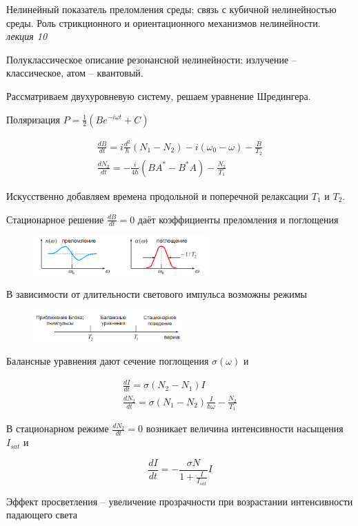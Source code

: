 
\begin{leftrules}
Нелинейный показатель преломления среды; связь с кубичной нелинейностью среды. Роль стрикционного и ориентационного механизмов нелинейности.
\\ \phantom{42} \hfill \textit{лекция 10} 
\end{leftrules}





Полуклассическое описание резонансной нелинейности:
излучение – классическое, атом – квантовый.

Рассматриваем двухуровневую систему, решаем уравнение Шредингера.

Поляризация $    P = \frac{1}{2} (B e^{-i \omega t } + C) $

\begin{align}
    \frac{d B}{d t} = i \frac{d^2}{\hbar}(N_1 - N_2) - i (\omega_0 - \omega) - \frac{B}{T_2} \\
    \frac{d N_2}{d t} = - \frac{i}{4 \hbar} (BA^* - B^*A) - \frac{N_2}{T_1}
\end{align}

Искусственно добавляем времена продольной и поперечной релаксации $T_1$ и $T_2$.

Стационарное решение $\frac{d B}{d t} = 0$ даёт коэффициенты преломления и поглощения

\begin{figure}[h]
    \centering
    \includegraphics[width=0.6\textwidth]{figures/16-1.png}
\end{figure}


В зависимости от длительности светового импульса возможны режимы

\begin{figure}[h]
    \centering
    \includegraphics[width=0.5\textwidth]{figures/16-2.png}
\end{figure}

Балансные уравнения дают сечение поглощения $\sigma(\omega)$ и

\begin{align}
    \frac{d I}{d t} = \sigma (N_2 - N_1) I \\
    \frac{d N_2}{d t } = \sigma (N_1 - N_2) \frac{I}{\hbar \omega} - \frac{N_2}{T_1}
\end{align}

В стационарном режиме $\frac{d N_2}{d t } = 0$ возникает величина интенсивности насыщения $I_{sat}$ и

\begin{equation}
    \frac{d I }{d t} = - \frac{\sigma N}{1 + \frac{I}{I_{sat}}} I
\end{equation}

Эффект просветления -- увеличение прозрачности при возрастании интенсивности падающего света
